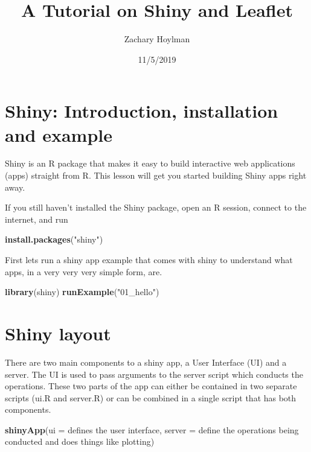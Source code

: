\documentclass[]{article}
\title{A Tutorial on Shiny and Leaflet}
\author{Zachary Hoylman}
\date{11/5/2019}
\newenvironment{Shaded}{\begin{snugshade}}{\end{snugshade}}
\newcommand{\DataTypeTok}[1]{\textcolor[rgb]{0.13,0.29,0.53}{#1}}
\newcommand{\KeywordTok}[1]{\textcolor[rgb]{0.13,0.29,0.53}{\textbf{#1}}}
\newcommand{\NormalTok}[1]{#1}
\newcommand{\StringTok}[1]{\textcolor[rgb]{0.31,0.60,0.02}{#1}}
\begin{document}
\maketitle

\hypertarget{shiny-introduction-installation-and-example}{%
\section{Shiny: Introduction, installation and
example}\label{shiny-introduction-installation-and-example}}

Shiny is an R package that makes it easy to build interactive web
applications (apps) straight from R. This lesson will get you started
building Shiny apps right away.

If you still haven't installed the Shiny package, open an R session,
connect to the internet, and run

\begin{Shaded}
\begin{Highlighting}[]
\KeywordTok{install.packages}\NormalTok{(}\StringTok{"shiny"}\NormalTok{)}
\end{Highlighting}
\end{Shaded}

First lets run a shiny app example that comes with shiny to understand
what apps, in a very very very simple form, are.

\begin{Shaded}
\begin{Highlighting}[]
\KeywordTok{library}\NormalTok{(shiny)}
\KeywordTok{runExample}\NormalTok{(}\StringTok{"01_hello"}\NormalTok{)}
\end{Highlighting}
\end{Shaded}

\hypertarget{shiny-layout}{%
\section{Shiny layout}\label{shiny-layout}}

There are two main components to a shiny app, a User Interface (UI) and
a server. The UI is used to pass arguments to the server script which
conducts the operations. These two parts of the app can either be
contained in two separate scripts (ui.R and server.R) or can be combined
in a single script that has both components.

\begin{Shaded}
\begin{Highlighting}[]
\KeywordTok{shinyApp}\NormalTok{(}\DataTypeTok{ui =}\NormalTok{ defines the user interface,}
         \DataTypeTok{server =}\NormalTok{ define the operations being conducted and does things like plotting)}
\end{Highlighting}
\end{Shaded}
\end{document}

